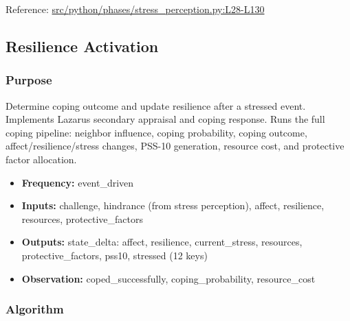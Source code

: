 \documentclass[
  letterpaper,
  DIV=11,
  numbers=noendperiod]{scrartcl}
\providecommand{\tightlist}{%
  \setlength{\itemsep}{0pt}\setlength{\parskip}{0pt}}
\begin{document}
Reference:
\href{https://github.com/namakala/abm-simulation/blob/84ff9b37fb0c569bef9f122e789d9c23a89348ec/src/python/phases/stress_perception.py\#L28-L130}{src/python/phases/stress\_perception.py:L28-L130}

\subsection{Resilience Activation}\label{resilience-activation}

\subsubsection{Purpose}\label{purpose-4}

Determine coping outcome and update resilience after a stressed event.
Implements Lazarus secondary appraisal and coping response. Runs the
full coping pipeline: neighbor influence, coping probability, coping
outcome, affect/resilience/stress changes, PSS-10 generation, resource
cost, and protective factor allocation.

\begin{itemize}
\tightlist
\item
  \textbf{Frequency:} event\_driven
\item
  \textbf{Inputs:} challenge, hindrance (from stress perception),
  affect, resilience, resources, protective\_factors
\item
  \textbf{Outputs:} state\_delta: affect, resilience, current\_stress,
  resources, protective\_factors, pss10, stressed (12 keys)
\item
  \textbf{Observation:} coped\_successfully, coping\_probability,
  resource\_cost
\end{itemize}

\subsubsection{Algorithm}\label{algorithm-2}
\end{document}
